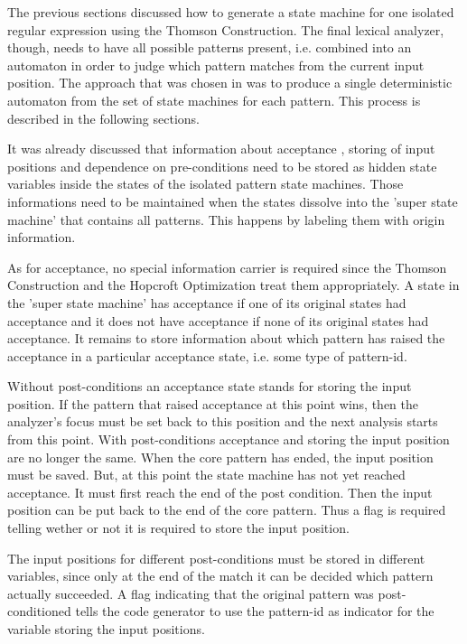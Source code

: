 The previous sections discussed how to generate a state machine for one
isolated regular expression using the Thomson Construction.  The final lexical
analyzer, though, needs to have all possible patterns present, i.e. combined
into an automaton in order to judge which pattern matches from the current
input position. The approach that was chosen in {\quex} was to produce a single
deterministic automaton from the set of state machines for each pattern.  This
process is described in the following sections.

It was already discussed that information about acceptance
, storing of input
positions and dependence on
pre-conditions  need to be stored
as hidden state variables\cite{} inside the states of the isolated pattern
state machines. Those informations need to be maintained when the states
dissolve into the 'super state machine' that contains all patterns. This happens
by labeling them with origin information.

As for acceptance, no special information carrier is required since the Thomson
Construction and the Hopcroft Optimization treat them appropriately. A 
state in the 'super state machine' has acceptance if one of its original states had
acceptance and it does not have acceptance if none of its original states had
acceptance. It remains to store information about which pattern has raised
the acceptance in a particular acceptance state, i.e. some type of pattern-id.

Without post-conditions an acceptance state stands for storing the input position.
If the pattern that raised acceptance at this point wins, then the analyzer's focus
must be set back to this position and the next analysis starts from this point. With
post-conditions acceptance and storing the input position are no longer the same.
When the core pattern has ended, the input position must be saved. But, at this
point the state machine has not yet reached acceptance. It must first reach the end
of the post condition. Then the input position can be put back to the end of the
core pattern. Thus a flag is required telling wether or not it is required to store
the input position.

The input positions for different post-conditions must be stored in different variables,
since only at the end of the match it can be decided which pattern  actually 
succeeded. A flag indicating that the original pattern was post-conditioned 
tells the code generator to use the pattern-id as indicator for the variable
storing the input positions.

